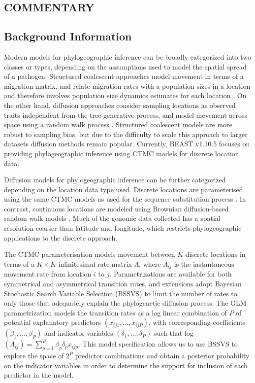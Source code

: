 \documentclass{article}
\begin{document}
\begin{multicols}{2}

\section*{COMMENTARY}
\subsection*{Background Information}

Modern models for phylogeographic inference can be broadly categorized into two classes or types, depending on the assumptions used to model the spatial spread of a pathogen.
Structured coalescent approaches model movement in terms of a migration matrix, and relate migration rates with a population sizes in a location and therefore involves population size dynamics estimates for each location \cite{basta,mascot}.
On the other hand, diffusion approaches consider sampling locations as observed traits independent from the tree-generative process, and model movement across space using a random walk process \cite{dta,rw}. 
Structured coalescent models are more robust to sampling bias, but due to the difficulty to scale this approach to larger datasets diffusion methods remain popular.
Currently, BEAST v1.10.5 focuses on providing phylogeographic inference using CTMC models for discrete location data.

Diffusion models for phylogeographic inference can be further categorized depending on the location data type used.
Discrete locations are parameterised using the same CTMC models as used for the sequence substitution process \cite{dta}.
In contrast, continuous locations are modeled using Brownian diffusion-based random walk models \cite{rw}.
Much of the genomic data collected has a spatial resolution coarser than latitude and longitude, which restricts phylogeographic applications to the discrete approach. 

The CTMC parameterisation models movement between $K$ discrete locations in terms of a $K \times K$ infinitesimal rate matrix $\Lambda$, where $\Lambda_{ij}$ is the instantaneous movement rate from location $i$ to $j$. Parametrizations are available for both symmetrical and asymmetrical transition rates, and extensions adopt Bayesian Stochastic Search Variable Selection (BSSVS) to limit the number of rates to only those that adequately explain the phylogenetic diffusion process. The GLM parametrization models the transition rates as a log linear combination of $P$ of potential explanatory predictors $(x_{ij1}, \dots, x_{ijP})$, with corresponding coefficients $(\beta_1, ..., \beta_P )$ and indicator variables $(\delta_1, ..., \delta_P )$ such that log$(\Lambda_{ij}) = \sum_{p=1}^P \beta_p \delta_p x_{ijp}$. This model specification allows us to use BSSVS to explore the space of $2^P$ predictor combinations and obtain a posterior probability on the indicator variables in order to determine the support for inclusion of each predictor in the model.


\end{multicols}
\end{document}
